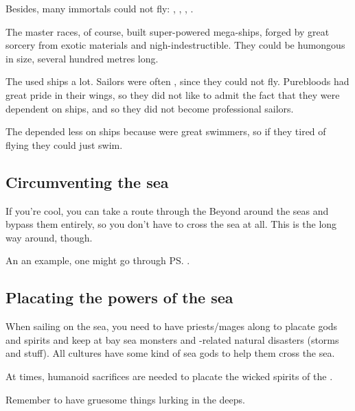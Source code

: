 Besides, many immortals could not fly: 
\QuilJaaran, \aryothim, \vorcanths, \bezedeth. 

The master races, of course, built super-powered mega-ships, forged by great sorcery from exotic materials and nigh-indestructible. They could be humongous in size, several hundred metres long. 

The \resphain used ships a lot.
Sailors were often \bezedeth, since they could not fly.
Purebloods had great pride in their wings, so they did not like to admit the fact that they were dependent on ships, and so they did not become professional sailors.

The \dragons depended less on ships because \dragons were great swimmers, so if they tired of flying they could just swim.







\subsection{Circumventing the sea}
If you're cool, you can take a route through the Beyond around the seas and bypass them entirely, so you don't have to cross the sea at all. 
This is the long way around, though. 

An an example, one might go through \ps{\QuessanthIshnaruchaefir} . 









\subsection{Placating the powers of the sea}
When sailing on the sea, you need to have priests/mages along to placate gods and spirits and keep at bay sea monsters and \Wylde{}-related natural disasters (storms and stuff). 
All cultures have some kind of sea gods to help them cross the sea. 

At times, humanoid sacrifices are needed to placate the wicked spirits of the .

Remember to have gruesome things lurking in the deeps. 










